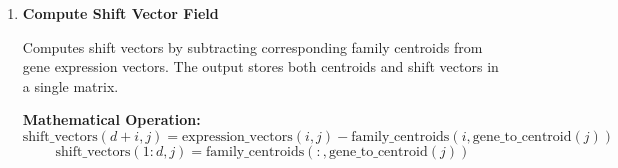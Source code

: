 \documentclass[11pt]{article}
\begin{document}
\begin{enumerate}
\begin{enumerate}
	      	      \textbf{Output arguments:}
	      	      \begin{itemize}
	      	      	\item \texttt{centroid\_matrix real(real64)}: Matrix of calculated family
	      	      	      centroid vectors with size \texttt{n\_axes $\times$ n\_families}
	      	      	      
	      	      	\item \texttt{selected\_indices integer(int32)}: Array of gene indices
	      	      	      used for the calculation with length of \texttt{n\_genes}
	      	      	      
	      	      	\item \texttt{ierr integer(int32)}: Error code (for error details
	      	      	      please check \hyperref[sec:error-handling]{error handling section}
	      	      	      )
	      	      \end{itemize}
	      	      
	      	      \begin{lstlisting}[language=Fortran, caption={Calculation of Family Centroids}]
call group_centroid(expression_vectors, n_axes, n_genes, &
                    gene_to_family, n_families, centroid_matrix, &
                    mode, selected_indices, ierr, ortholog_set)
	      	      \end{lstlisting}
	      	      
	      	\item \textbf{Compute Shift Vector Field}

            Computes shift vectors by subtracting corresponding family centroids from gene expression vectors. The output stores both centroids and shift vectors in a single matrix.
            
            \textbf{Mathematical Operation:}
            \[ \text{shift\_vectors}(d+i, j) = \text{expression\_vectors}(i, j) - \text{family\_centroids}(i, \text{gene\_to\_centroid}(j)) \]
            \[ \text{shift\_vectors}(1:d, j) = \text{family\_centroids}(:, \text{gene\_to\_centroid}(j)) \]
            

\end{enumerate}
\end{enumerate}
\end{document}

